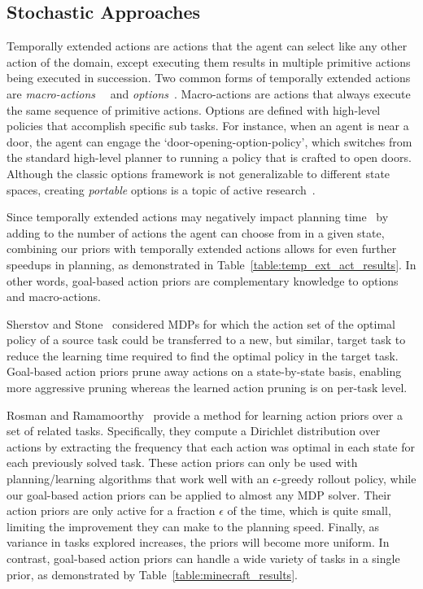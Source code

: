 \documentclass[letterpaper]{article}
\begin{document}
\subsection{Stochastic Approaches}

Temporally extended actions are actions that the agent can select like
any other action of the domain, except executing them results in
multiple primitive actions being executed in succession. Two common
forms of temporally extended actions are {\em
  macro-actions}~\cite{hauskrecht98} ~and {\em
  options}~\cite{sutton99}.  Macro-actions are actions that always
execute the same sequence of primitive actions. Options are defined
with high-level policies that accomplish specific sub tasks. For
instance, when an agent is near a door, the agent can engage the
`door-opening-option-policy', which switches from the standard
high-level planner to running a policy that is crafted to open doors.
Although the classic options framework is not generalizable to
different state spaces, creating {\em portable} options is a topic of
active
research~\cite{konidaris07,konidaris2009efficient,Ravindran03analgebraic,croonenborghs2008learning,andre2002state,konidaris2012transfer}.

Since temporally extended actions may negatively impact planning
time~\cite{Jong:2008zr} by adding to the number of actions the agent
can choose from in a given state, combining our priors with
temporally extended actions allows for even further speedups in
planning, as demonstrated in Table~\ref{table:temp_ext_act_results}. In
other words, goal-based action priors are complementary knowledge to options and
macro-actions.

Sherstov and Stone~\cite{sherstov2005improving} considered MDPs for
which the action set of the optimal policy of a source task could be
transferred to a new, but similar, target task to reduce the learning
time required to find the optimal policy in the target task.
Goal-based action priors prune away actions on a state-by-state basis, enabling
more aggressive pruning whereas the learned action pruning is on per-task
level.

Rosman and Ramamoorthy~\cite{rosman2012good} provide a method for
learning action priors over a set of related tasks. Specifically, they
compute a Dirichlet distribution over actions by extracting the
frequency that each action was optimal in each state for each
previously solved task.  These action priors can only be used with
planning/learning algorithms that work well with an $\epsilon$-greedy
rollout policy, while our goal-based action priors can be applied to almost any MDP
solver.  Their action priors are only active for a fraction $\epsilon$ of the time,
which is quite small, limiting the improvement they
can make to the planning speed.  Finally, as variance in tasks
explored increases, the priors will become more uniform. In contrast,
goal-based action priors can handle a wide variety of tasks in a
single prior, as demonstrated by
Table~\ref{table:minecraft_results}.
\end{document}
